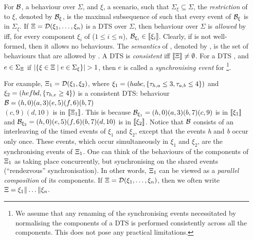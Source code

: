 For $\mathcal{B}$, a behaviour over $\Sigma$, and $\xi$, a
scenario, such that $\Sigma_{\xi} \subseteq \Sigma$,
the \emph{restriction} of  to $\xi$, denoted by
$\mathcal{B}_{\xi}$, is the maximal subsequence of  such that
every event of $\mathcal{B}_{\xi}$ is in $\Sigma_{\xi}$.
If $\Xi=\mathcal{D}(\xi_1,\dots,\xi_n)$ is a DTS
over $\Sigma$, then behaviour  over
$\Sigma$ is
\emph{allowed} by \DScenario{} iff, for every component $\xi_i$ of \DScenario{}
($1\leq i\leq n$), $\mathcal{B}_{\xi_i} \in \llbracket \xi_i \rrbracket$.
Clearly, if \DScenario{} is not well-formed, then it allows no behaviours.
The \emph{semantics} of \DScenario,
denoted by \Sem{\DScenario}, is the set of behaviours that are allowed
by \DScenario.
A DTS \DScenario{} is \emph{consistent}
iff $\llbracket \Xi \rrbracket \neq \emptyset$.
For a DTS \DScenario{}, and $e \in \Sigma_{\Xi}{}$ if
  $|\{\xi \in \Xi\;|\;e \in \Sigma_{\xi}\}| > 1$, then $e$ is
  called a \emph{synchronising event} for \DScenario{}\footnote{
  We assume that any renaming of the synchronising events necessitated by normalising
  the components of a DTS is performed consistently
  across all the components. This does not pose any practical limitations.}.

For example, $\Xi_1 = \mathcal{D}(\xi_1,\xi_2)$, where
 $\xi_1 = (habc, \{\tau_{h,a} \leq 3, \tau_{a,b} \leq
 4\})$ and $\xi_2 =
 (hefbd, \{\tau_{h,e} \geq 4\})$ is a consistent DTS:
 behaviour $\mathcal{B} = (h,0)
 (a,3)(e,5)(f,6)(b,7)$\\$(c,9)(d,10)$ is in $\llbracket \Xi_1 \rrbracket$.
 This is because $\mathcal{B}_{\xi_1} = (h, 0) (a, 3)(b,
 7)(c, 9)$ is in $\llbracket \xi_1 \rrbracket$
and $\mathcal{B}_{\xi_2} =  (h, 0) (e, 5)(f, 6)(b, 7)(d,10)$ is in
$\llbracket \xi_2 \rrbracket$.
Notice that $\mathcal{B}$ consists of an
interleaving of the timed events of $\xi_1$ and $\xi_2$, except that
the events \emph{h} and \emph{b} occur only once. These events,
which occur simultaneously in $\xi_1$ and $\xi_2$, are the
synchronising events of $\Xi_1$.
One can think of the behaviours of the components of $\Xi_1$ as
taking place concurrently, but synchronising on the shared events
(``rendezvous'' synchronisation).
In other words, $\Xi_1$ can be viewed as a \emph{parallel composition} of
its components.
If $\Xi=\mathcal{D}(\xi_1,\dots,\xi_n)$, then we often write
$\Xi=\xi_1\Vert\dots\Vert\xi_n$.

